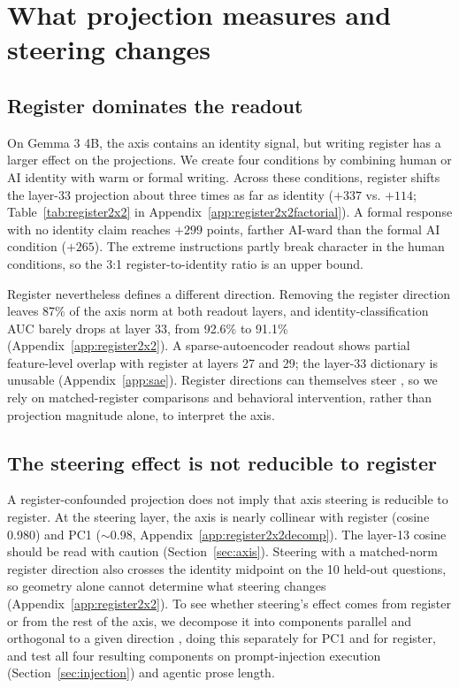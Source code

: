 \section{What projection measures and steering changes}
\label{sec:calibration}

\subsection{Register dominates the readout}

On Gemma 3 4B, the axis contains an identity signal, but writing register
has a larger effect on the projections. We create four conditions by
combining human or AI identity with warm or formal writing. Across these
conditions, register shifts the layer-33 projection about three times as far
as identity ($+337$ vs. $+114$; Table~\ref{tab:register2x2} in
Appendix~\ref{app:register2x2factorial}). A formal response with no identity
claim reaches $+299$ points, farther AI-ward than the formal AI condition
($+265$). The extreme instructions partly break character in the human
conditions, so the 3:1 register-to-identity ratio is an upper bound.

Register nevertheless defines a different direction. Removing the register
direction leaves 87\% of the axis norm at both readout layers, and
identity-classification AUC barely drops at layer 33, from 92.6\% to 91.1\%
(Appendix~\ref{app:register2x2}). A sparse-autoencoder readout
\citep{bricken2023monosemanticity, templeton2024scaling} shows partial
feature-level overlap with register at layers 27 and 29; the layer-33
dictionary is unusable (Appendix~\ref{app:sae}). Register directions can themselves steer
\citep{konen2024style}, so we rely on matched-register comparisons and
behavioral intervention, rather than projection magnitude alone, to
interpret the axis.

\subsection{The steering effect is not reducible to register}

A register-confounded projection does not imply that axis steering is
reducible to register. At the steering layer, the axis is nearly collinear
with register (cosine 0.980) and PC1 ($\sim$0.98,
Appendix~\ref{app:register2x2decomp}). The layer-13 cosine should be read
with caution (Section~\ref{sec:axis}). Steering with a matched-norm register
direction also crosses the identity midpoint on the 10 held-out questions,
so geometry alone cannot determine what steering changes
(Appendix~\ref{app:register2x2}). To see whether steering's effect comes
from register or from the rest of the axis, we decompose it into components
parallel and orthogonal to a given direction \citep{arditi2024refusal},
doing this separately for PC1 and for register, and test all four resulting
components on prompt-injection execution (Section~\ref{sec:injection}) and
agentic prose length.

